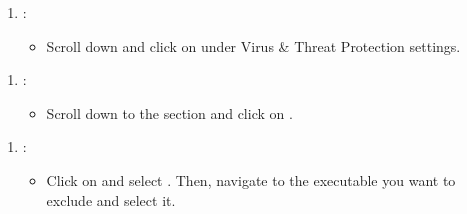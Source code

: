 \documentclass[letterpaper,10pt,english]{sphinxmanual}
\begin{document}
\begin{figure}[htbp]
\centering

\noindent{}
\end{figure}
\begin{enumerate}
%
\setcounter{enumi}{2}
\item {} 
\sphinxAtStartPar
{}:
\begin{itemize}
\item {} 
\sphinxAtStartPar
Scroll down and click on  under Virus \& Threat Protection settings.

\end{itemize}

\end{enumerate}

\begin{figure}[htbp]
\centering

\noindent{}
\end{figure}
\begin{enumerate}
%
\setcounter{enumi}{3}
\item {} 
\sphinxAtStartPar
{}:
\begin{itemize}
\item {} 
\sphinxAtStartPar
Scroll down to the  section and click on .

\end{itemize}

\end{enumerate}

\begin{figure}[htbp]
\centering

\noindent{}
\end{figure}
\begin{enumerate}
%
\setcounter{enumi}{4}
\item {} 
\sphinxAtStartPar
{}:
\begin{itemize}
\item {} 
\sphinxAtStartPar
Click on  and select . Then, navigate to the executable you want to exclude and select it.

\end{itemize}

\end{enumerate}
\end{document}
